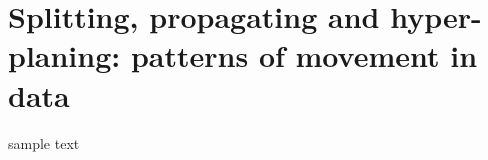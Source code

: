 \documentclass[book.tex]{subfiles}
\begin{document}
\chapter{Splitting, propagating and hyper-planing: patterns of movement in data }

sample text
\end{document}

